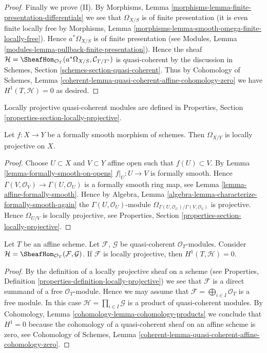 \begin{proof}
\medskip\noindent
Finally we prove (II).
By Morphisms, Lemma \ref{morphisms-lemma-finite-presentation-differentials}
we see that $\Omega_{X/S}$ is of finite presentation
(it is even finite locally free by
Morphisms, Lemma \ref{morphisms-lemma-smooth-omega-finite-locally-free}).
Hence $a^*\Omega_{X/S}$ is of finite presentation (see
Modules, Lemma \ref{modules-lemma-pullback-finite-presentation}).
Hence the sheaf
$\mathcal{H} =
\SheafHom_{\mathcal{O}_T}(a^*\Omega_{X/S}, \mathcal{C}_{T/T'})$
is quasi-coherent by the discussion in
Schemes, Section \ref{schemes-section-quasi-coherent}.
Thus by Cohomology of Schemes, Lemma
\ref{coherent-lemma-quasi-coherent-affine-cohomology-zero}
we have $H^1(T, \mathcal{H}) = 0$ as desired.
\end{proof}

\noindent
Locally projective quasi-coherent modules are defined in
Properties, Section \ref{properties-section-locally-projective}.

\begin{lemma}
\label{lemma-formally-smooth-sheaf-differentials}
Let $f : X \to Y$ be a formally smooth morphism of schemes.
Then $\Omega_{X/Y}$ is locally projective on $X$.
\end{lemma}

\begin{proof}
Choose $U \subset X$ and $V \subset Y$ affine open such that
$f(U) \subset V$. By
Lemma \ref{lemma-formally-smooth-on-opens}
$f|_U : U \to V$ is formally smooth. Hence
$\Gamma(V, \mathcal{O}_V) \to \Gamma(U, \mathcal{O}_U)$ is
a formally smooth ring map, see
Lemma \ref{lemma-affine-formally-smooth}.
Hence by
Algebra, Lemma \ref{algebra-lemma-characterize-formally-smooth-again}
the $\Gamma(U, \mathcal{O}_U)$-module
$\Omega_{\Gamma(U, \mathcal{O}_U)/\Gamma(V, \mathcal{O}_V)}$
is projective. Hence $\Omega_{U/V}$ is locally projective, see
Properties, Section \ref{properties-section-locally-projective}.
\end{proof}

\begin{lemma}
\label{lemma-h1-is-zero}
Let $T$ be an affine scheme. Let $\mathcal{F}$, $\mathcal{G}$ be quasi-coherent
$\mathcal{O}_T$-modules. Consider
$\mathcal{H} = \SheafHom_{\mathcal{O}_T}(\mathcal{F}, \mathcal{G})$.
If $\mathcal{F}$ is locally projective, then $H^1(T, \mathcal{H}) = 0$.
\end{lemma}

\begin{proof}
By the definition of a locally projective sheaf on a scheme (see
Properties, Definition \ref{properties-definition-locally-projective})
we see that $\mathcal{F}$ is a direct summand of a free
$\mathcal{O}_T$-module. Hence we may assume that
$\mathcal{F} = \bigoplus_{i \in I} \mathcal{O}_T$ is a free module.
In this case $\mathcal{H} = \prod_{i \in I} \mathcal{G}$ is
a product of quasi-coherent modules. By
Cohomology, Lemma \ref{cohomology-lemma-cohomology-products}
we conclude that $H^1 = 0$ because the cohomology of a quasi-coherent sheaf
on an affine scheme is zero, see Cohomology of Schemes, Lemma
\ref{coherent-lemma-quasi-coherent-affine-cohomology-zero}.
\end{proof}

